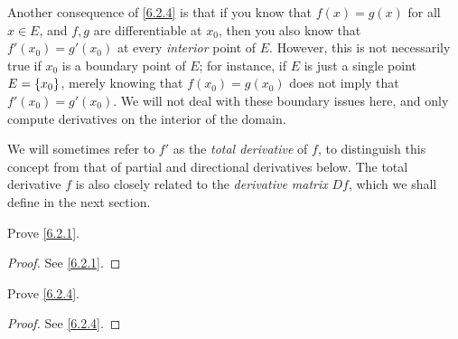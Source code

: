 \begin{note}
  Another consequence of \cref{6.2.4} is that if you know that \(f(x) = g(x)\) for all \(x \in E\), and \(f, g\) are differentiable at \(x_0\), then you also know that \(f'(x_0) = g'(x_0)\) at every \emph{interior} point of \(E\).
  However, this is not necessarily true if \(x_0\) is a boundary point of \(E\);
  for instance, if \(E\) is just a single point \(E = \left\lbrace x_0\right\rbrace\), merely knowing that \(f(x_0) = g(x_0)\) does not imply that \(f'(x_0) = g'(x_0)\).
  We will not deal with these boundary issues here, and only compute derivatives on the interior of the domain.
\end{note}

\begin{note}
  We will sometimes refer to \(f'\) as the \emph{total derivative} of \(f\), to distinguish this concept from that of partial and directional derivatives below.
  The total derivative \(f\) is also closely related to the \emph{derivative matrix} \(Df\),
  which we shall define in the next section.
\end{note}

\exercisesection

\begin{ex}\label{ex:6.2.1}
  Prove \cref{6.2.1}.
\end{ex}

\begin{proof}
  See \cref{6.2.1}.
\end{proof}

\begin{ex}\label{ex:6.2.2}
  Prove \cref{6.2.4}.
\end{ex}

\begin{proof}
  See \cref{6.2.4}.
\end{proof}
